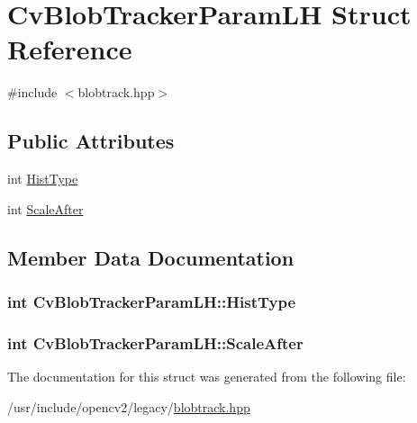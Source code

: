 \hypertarget{structCvBlobTrackerParamLH}{\section{Cv\-Blob\-Tracker\-Param\-L\-H Struct Reference}
\label{structCvBlobTrackerParamLH}
}


{\ttfamily \#include $<$blobtrack.\-hpp$>$}

\subsection*{Public Attributes}
\begin{DoxyCompactItemize}
\item 
int \hyperlink{structCvBlobTrackerParamLH_ae5e714696306f2fd606b3b315d13ee86}{Hist\-Type}
\item 
int \hyperlink{structCvBlobTrackerParamLH_adf4a85b9cf9885a7ce8f765c1269fc68}{Scale\-After}
\end{DoxyCompactItemize}


\subsection{Member Data Documentation}
\hypertarget{structCvBlobTrackerParamLH_ae5e714696306f2fd606b3b315d13ee86}{
\subsubsection[{Hist\-Type}]{\setlength{\rightskip}{0pt plus 5cm}int Cv\-Blob\-Tracker\-Param\-L\-H\-::\-Hist\-Type}}\label{structCvBlobTrackerParamLH_ae5e714696306f2fd606b3b315d13ee86}
\hypertarget{structCvBlobTrackerParamLH_adf4a85b9cf9885a7ce8f765c1269fc68}{
\subsubsection[{Scale\-After}]{\setlength{\rightskip}{0pt plus 5cm}int Cv\-Blob\-Tracker\-Param\-L\-H\-::\-Scale\-After}}\label{structCvBlobTrackerParamLH_adf4a85b9cf9885a7ce8f765c1269fc68}


The documentation for this struct was generated from the following file\-:\begin{DoxyCompactItemize}
\item 
/usr/include/opencv2/legacy/\hyperlink{blobtrack_8hpp}{blobtrack.\-hpp}\end{DoxyCompactItemize}
